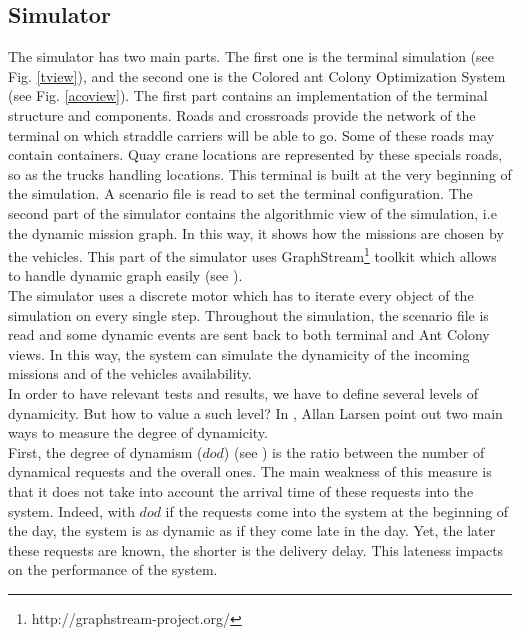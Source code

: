 \documentclass[a4paper,10pt]{article}
\begin{document}
\begin{multicols}{2}
\section{Simulator}
The simulator has two main parts. The first one is the terminal simulation (see Fig. \ref{tview}), and the second one is the Colored ant Colony Optimization System (see Fig. \ref{acoview}).
The first part contains an implementation of the terminal structure and components. Roads and crossroads provide the network of the terminal on which straddle carriers will be able to go. Some of these roads may contain containers. Quay crane locations are represented by these specials roads, so as the trucks handling locations. This terminal is built at the very beginning of the simulation. A scenario file is read to set the terminal configuration.
The second part of the simulator contains the algorithmic view of the simulation, i.e the dynamic mission graph. In this way, it shows how the missions are chosen by the vehicles. This part of the simulator uses GraphStream\footnote{http://graphstream-project.org/} toolkit which allows to handle dynamic graph easily (see \cite{Dutot2007}).\\

The simulator uses a discrete motor which has to iterate every object of the simulation on every single step. Throughout the simulation, the scenario file is read and some dynamic events are sent back to both terminal and Ant Colony views. In this way, the system can simulate the dynamicity %
of the incoming missions and of the vehicles availability.\\

In order to have relevant tests and results, we have to define several levels of dynamicity. But how to value a such level? In \cite{larsen00}, Allan Larsen point out two main ways to measure the degree of dynamicity.\\

First, the degree of dynamism ($dod$) (see \cite{Lund96}) is the ratio between the number of dynamical requests and the overall ones. The main weakness of this measure is that it does not take  into account the arrival time of these requests into the system. Indeed, with $dod$ if the requests come into the system at the beginning of the day, the system is as dynamic as if they come late in the day. Yet, the later these requests are known, the shorter is the delivery delay. This lateness impacts on the performance of the system.\\


\end{multicols}
\end{document}

